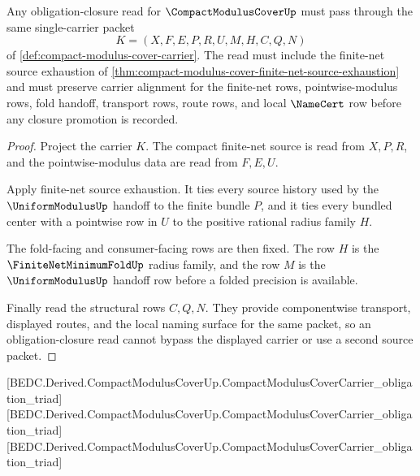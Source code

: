 \begin{theorem}
\label{thm:compact-modulus-cover-ai-tastegate-scope}
Any obligation-closure read for $\CompactModulusCoverUp$ must pass through the same single-carrier packet
$$
K=(X,F,E,P,R,U,M,H,C,Q,N)
$$
of \autoref{def:compact-modulus-cover-carrier}. The read must include the finite-net source exhaustion of \autoref{thm:compact-modulus-cover-finite-net-source-exhaustion} and must preserve carrier alignment for the finite-net rows, pointwise-modulus rows, fold handoff, transport rows, route rows, and local $\NameCert$ row before any closure promotion is recorded.
\end{theorem}
\begin{proof}
Project the carrier $K$. The compact finite-net source is read from $X,P,R$, and the pointwise-modulus data are read from $F,E,U$.

Apply finite-net source exhaustion. It ties every source history used by the $\UniformModulusUp$ handoff to the finite bundle $P$, and it ties every bundled center with a pointwise row in $U$ to the positive rational radius family $H$.

The fold-facing and consumer-facing rows are then fixed. The row $H$ is the $\FiniteNetMinimumFoldUp$ radius family, and the row $M$ is the $\UniformModulusUp$ handoff row before a folded precision is available.

Finally read the structural rows $C,Q,N$. They provide componentwise transport, displayed routes, and the local naming surface for the same packet, so an obligation-closure read cannot bypass the displayed carrier or use a second source packet.
\end{proof}

[BEDC.Derived.CompactModulusCoverUp.CompactModulusCoverCarrier\_obligation\_triad]
[BEDC.Derived.CompactModulusCoverUp.CompactModulusCoverCarrier\_obligation\_triad]
[BEDC.Derived.CompactModulusCoverUp.CompactModulusCoverCarrier\_obligation\_triad]

